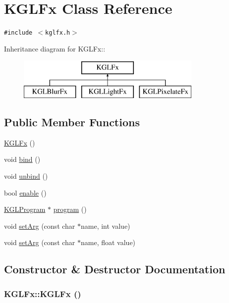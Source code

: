 \hypertarget{class_k_g_l_fx}{
\section{KGLFx Class Reference}
\label{class_k_g_l_fx}
}
{\tt \#include $<$kglfx.h$>$}

Inheritance diagram for KGLFx::\begin{figure}[H]
\begin{center}
\leavevmode
\includegraphics[height=2cm]{class_k_g_l_fx}
\end{center}
\end{figure}
\subsection*{Public Member Functions}
\begin{CompactItemize}
\item 
\hyperlink{class_k_g_l_fx_dd30f0c4b9ed54ee0be6d9cfd72890e8}{KGLFx} ()
\item 
void \hyperlink{class_k_g_l_fx_b96fa94be7e76720b806a098ffb8ee34}{bind} ()
\item 
void \hyperlink{class_k_g_l_fx_b3eaa1c6e1c562b43374bc4d1b670967}{unbind} ()
\item 
bool \hyperlink{class_k_g_l_fx_768cebc0d09e441e398ef4a5ac06f28a}{enable} ()
\item 
\hyperlink{class_k_g_l_program}{KGLProgram} $\ast$ \hyperlink{class_k_g_l_fx_c02c704f61750f6eb5b49f48d0a74820}{program} ()
\item 
void \hyperlink{class_k_g_l_fx_ce266e6c653796d142396ce056ec1b96}{setArg} (const char $\ast$name, int value)
\item 
void \hyperlink{class_k_g_l_fx_4406ef8524d0e53f64d30f7b6e229bc3}{setArg} (const char $\ast$name, float value)
\end{CompactItemize}


\subsection{Constructor \& Destructor Documentation}
\hypertarget{class_k_g_l_fx_dd30f0c4b9ed54ee0be6d9cfd72890e8}{
\subsubsection[{KGLFx}]{\setlength{\rightskip}{0pt plus 5cm}KGLFx::KGLFx ()}}
\label{class_k_g_l_fx_dd30f0c4b9ed54ee0be6d9cfd72890e8}




